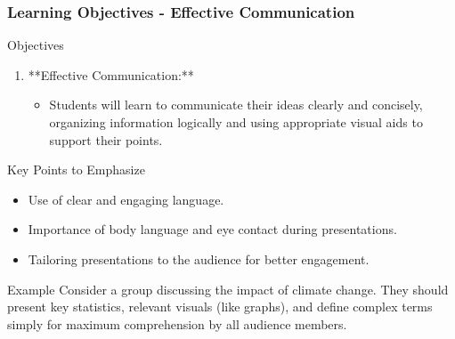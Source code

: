 \documentclass{beamer}
\begin{document}
\begin{frame}[fragile]
    \frametitle{Learning Objectives - Effective Communication}
    \begin{block}{Objectives}
        \begin{enumerate}
            \item **Effective Communication:**
            \begin{itemize}
                \item Students will learn to communicate their ideas clearly and concisely, organizing information logically and using appropriate visual aids to support their points.
            \end{itemize}
        \end{enumerate}
    \end{block}

    \begin{block}{Key Points to Emphasize}
        \begin{itemize}
            \item Use of clear and engaging language.
            \item Importance of body language and eye contact during presentations.
            \item Tailoring presentations to the audience for better engagement.
        \end{itemize}
    \end{block}

    \begin{block}{Example}
        Consider a group discussing the impact of climate change. They should present key statistics, relevant visuals (like graphs), and define complex terms simply for maximum comprehension by all audience members.
    \end{block}
\end{frame}
\end{document}
